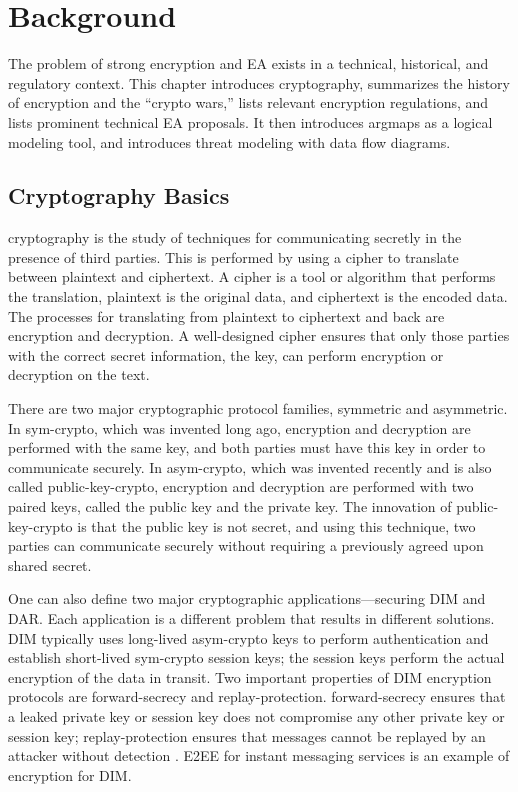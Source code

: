 \chapter{Background}
\label{chap-background}

The problem of strong encryption and \acl{EA} exists in a technical, historical, and regulatory context. This chapter
introduces cryptography, summarizes the history of encryption and the ``crypto wars,'' lists relevant encryption
regulations, and lists prominent technical \ac{EA} proposals. It then introduces \acp{argmap} as a logical modeling
tool, and introduces threat modeling with data flow diagrams.



\section{Cryptography Basics}
\label{sec-crypto-basics}

\Ac{cryptography} is the study of techniques for communicating secretly in the presence of third parties. This is
performed by using a \ac{cipher} to translate between \ac{plaintext} and \ac{ciphertext}. A cipher is a tool or
algorithm that performs the translation, plaintext is the original data, and ciphertext is the encoded data. The
processes for translating from plaintext to ciphertext and back are \ac{encryption} and \ac{decryption}. A well-designed
cipher ensures that only those parties with the correct secret information, the \ac{key}, can perform encryption or
decryption on the text.


There are two major cryptographic protocol families, symmetric and asymmetric. In \ac{sym-crypto}, which was invented
long ago, encryption and decryption are performed with the same key, and both parties must have this key in order to
communicate securely. In \ac{asym-crypto}, which was invented recently and is also called \ac{public-key-crypto},
encryption and decryption are performed with two paired keys, called the public key and the private key. The innovation
of \ac{public-key-crypto} is that the public key is not secret, and using this technique, two parties can communicate
securely without requiring a previously agreed upon shared secret.

One can also define two major cryptographic applications---securing \acf{DIM} and \acf{DAR}. Each application is a
different problem that results in different solutions. \Ac{DIM} typically uses long-lived \ac{asym-crypto} keys to
perform authentication and establish short-lived \ac{sym-crypto} session keys; the session keys perform the actual
encryption of the data in transit. Two important properties of \ac{DIM} encryption protocols are \ac{forward-secrecy}
and \ac{replay-protection}. \Ac{forward-secrecy} ensures that a leaked private key or session key does not compromise
any other private key or session key; \ac{replay-protection} ensures that messages cannot be replayed by an
attacker without detection \cite{bellovin_thinking_2016}. \Ac{E2EE} for instant messaging services is an example of
encryption for \ac{DIM}.

